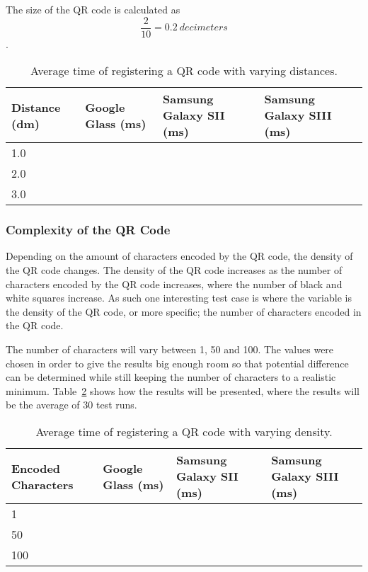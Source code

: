 The size of the QR code is calculated as \[\frac{2}{10} = 0.2~decimeters\].

	\begin{table}[ht!]
    		\caption{Average time of registering a QR code with varying distances.} \label{tab:distanceAverage}
		\centering \begin{tabularx}{\textwidth}{l|X|X|X} \hline
		\textbf{Distance (dm)} & \textbf{Google Glass (ms)} & \textbf{Samsung Galaxy SII (ms)} & \textbf{Samsung Galaxy SIII (ms)} \\ \hline \hline
       
		1.0	&	&	&	\\ \hline
		2.0	&	&	&	\\ \hline
		3.0	&	&	&	\\ \hline
		
		\end{tabularx}
	\end{table}

\subsubsection{Complexity of the QR Code}
Depending on the amount of characters encoded by the QR code, the density of the QR code changes. The density of the QR code increases as the number of characters encoded by the QR code increases, where the number of black and white squares increase. As such one interesting test case is where the variable is the density of the QR code, or more specific; the number of characters encoded in the QR code.

The number of characters will vary between 1, 50 and 100. The values were chosen in order to give the results big enough room so that potential difference can be determined while still keeping the number of characters to a realistic minimum. Table~\ref{tab:complexityAverage} shows how the results will be presented, where the results will be the average of 30 test runs.

	\begin{table}[ht!]
    		\caption{Average time of registering a QR code with varying density.} \label{tab:complexityAverage}
		\centering \begin{tabularx}{\textwidth}{l|X|X|X} \hline
		\textbf{Encoded Characters} & \textbf{Google Glass (ms)} & \textbf{Samsung Galaxy SII (ms)} & \textbf{Samsung Galaxy SIII (ms)} \\ \hline \hline
       
		1	&	&	&	\\ \hline
		50	&	&	&	\\ \hline
		100	&	&	&	\\ \hline
		
		\end{tabularx}
	\end{table}

